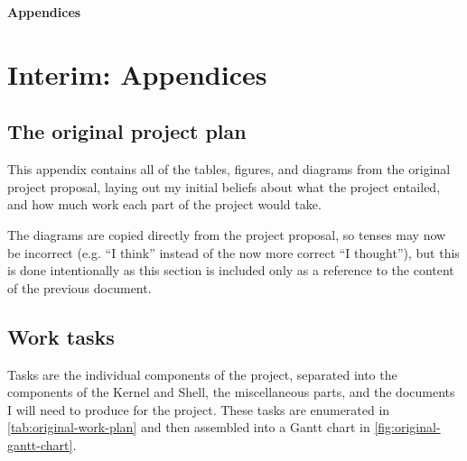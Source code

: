 \documentclass{article}
\begin{document}
\nocite{osdev-wiki}
\nocite{unix-prog-env}
\printbibliography[heading=bibintoc]


































\clearpage
\appendix
{}
\newrefsection
{}
\renewcommand{\thesubsection}{\Alph{subsection}}
\renewcommand{\thesubsubsection}{\thesubsection.\alph{subsubsection}}

{\Large\bfseries Appendices\vspace{2ex}}

\section{Interim: Appendices}
\subsection{The original project plan}
This appendix contains all of the tables, figures, and diagrams from the
original project proposal, laying out my initial beliefs about what the project
entailed, and how much work each part of the project would take.

The diagrams are copied directly from the project proposal, so tenses may now
be incorrect (e.g. ``I think'' instead of the now more correct ``I thought''),
but this is done intentionally as this section is included only as a reference
to the content of the previous document.

\subsection{Work tasks}
Tasks are the individual components of the project, separated into the
components of the Kernel and Shell, the miscellaneous parts, and the documents
I will need to produce for the project. These tasks are enumerated in
\autoref{tab:original-work-plan} and then assembled into a Gantt chart in
\autoref{fig:original-gantt-chart}.
\end{document}
